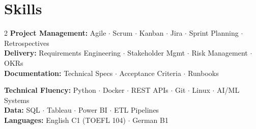 \documentclass[10pt,a4paper]{article}
\begin{document}
\section{Skills}
\begin{multicols}{2}
\small\noindent
{\color{accent}\bfseries Project Management:} Agile $\cdot$ Scrum $\cdot$ Kanban $\cdot$ Jira $\cdot$ Sprint Planning $\cdot$ Retrospectives\\[1pt]
{\color{accent}\bfseries Delivery:} Requirements Engineering $\cdot$ Stakeholder Mgmt $\cdot$ Risk Management $\cdot$ OKRs\\[1pt]
{\color{accent}\bfseries Documentation:} Technical Specs $\cdot$ Acceptance Criteria $\cdot$ Runbooks

\columnbreak
{\color{accent}\bfseries Technical Fluency:} Python $\cdot$ Docker $\cdot$ REST APIs $\cdot$ Git $\cdot$ Linux $\cdot$ AI/ML Systems\\[1pt]
{\color{accent}\bfseries Data:} SQL $\cdot$ Tableau $\cdot$ Power BI $\cdot$ ETL Pipelines\\[1pt]
{\color{accent}\bfseries Languages:} English C1 (TOEFL 104) $\cdot$ German B1
\end{multicols}
\end{document}
